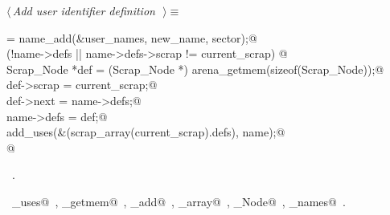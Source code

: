 \documentclass{report}
\begin{document}
\begin{flushleft} \small
\begin{minipage}{\linewidth} \label{scrap167}
$\langle\,${\it Add user identifier definition}\nobreak\ {\footnotesize {}}$\,\rangle\equiv$
\vspace{-1ex}
\begin{list}{}{} \item
\mbox{}\verb@name = name_add(&user_names, new_name, sector);@\\
\mbox{}\verb@if (!name->defs || name->defs->scrap != current_scrap) {@\\
\mbox{}\verb@  Scrap_Node *def = (Scrap_Node *) arena_getmem(sizeof(Scrap_Node));@\\
\mbox{}\verb@  def->scrap = current_scrap;@\\
\mbox{}\verb@  def->next = name->defs;@\\
\mbox{}\verb@  name->defs = def;@\\
\mbox{}\verb@  add_uses(&(scrap_array(current_scrap).defs), name);@\\
\mbox{}\verb@}@{\NWsep}
\end{list}
\vspace{-1ex}
\footnotesize\addtolength{\baselineskip}{-1ex}
\begin{list}{}{\setlength{\itemsep}{-\parsep}\setlength{\itemindent}{-\leftmargin}}
\item \NWtxtMacroRefIn\ .
\end{list}
\vspace{-2ex}
\footnotesize\addtolength{\baselineskip}{-1ex}
\begin{list}{}{\setlength{\itemsep}{-\parsep}\setlength{\itemindent}{-\leftmargin}}
\item \NWtxtIdentsUsed\nobreak\  \verb@add_uses@\nobreak\ , \verb@arena_getmem@\nobreak\ , \verb@name_add@\nobreak\ , \verb@scrap_array@\nobreak\ , \verb@Scrap_Node@\nobreak\ , \verb@user_names@\nobreak\ .\end{list}
\end{minipage}\\[4ex]
\end{flushleft}
\end{document}
